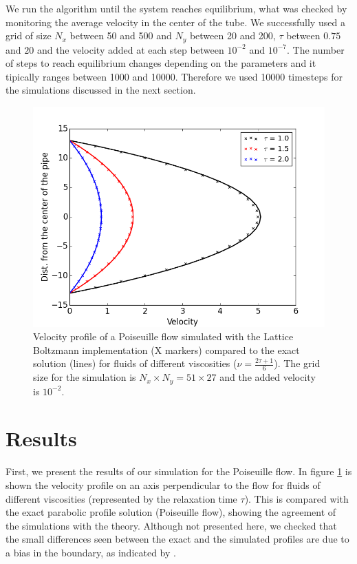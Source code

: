 \documentclass[aps,prl,reprint,groupedaddress]{revtex4-1}
\begin{document}
We run the algorithm until the system reaches equilibrium, what was checked by monitoring the average velocity in the center of the tube. We successfully used a grid of size $N_x$ between 50 and 500 and $N_y$ between 20 and 200, $\tau$ between $0.75$ and $20$ and the velocity added at each step between $10^{-2}$ and $10^{-7}$. The number of steps to reach equilibrium changes depending on the parameters and it tipically ranges between 1000 and 10000. Therefore we used 10000 timesteps for the simulations discussed in the next section. 

\begin{figure}[ht]
	\includegraphics[scale=0.4]{poiseuille.png}
	\caption{Velocity profile of a Poiseuille flow simulated with the Lattice Boltzmann implementation (X markers) compared to the exact solution (lines) for fluids of different viscosities ($\nu = \frac{2\tau + 1}{6}$). The grid size for the simulation is $N_x \times N_y = 51 \times 27$ and the added velocity is $10^{-2}$. \label{poiseuille}}
\end{figure}

\section{Results}

First, we present the results of our simulation for the Poiseuille flow. In figure \ref{poiseuille} is shown the velocity profile on an axis perpendicular to the flow for fluids of different viscosities (represented by the relaxation time $\tau$). This is compared with the exact parabolic profile solution (Poiseuille flow), showing the agreement of the simulations with the theory. Although not presented here, we checked that the small differences seen between the exact and the simulated profiles are due to a bias in the boundary, as indicated by \cite{He1997a}.
\end{document}
